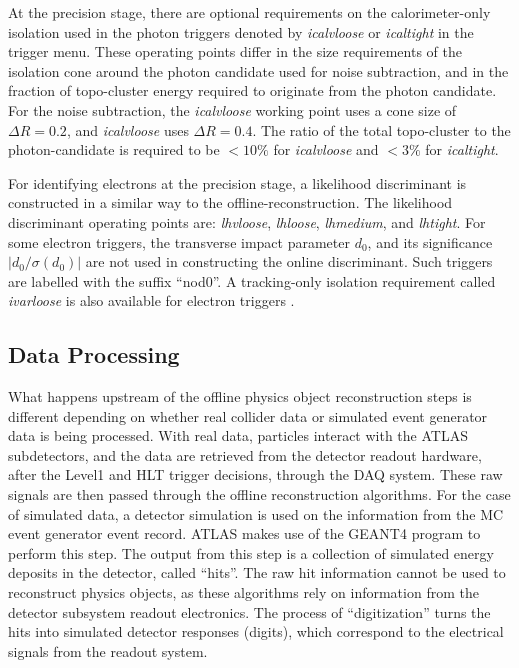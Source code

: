 At the precision stage, there are optional requirements on the calorimeter-only isolation used in the photon triggers denoted by \textit{icalvloose} or \textit{icaltight} in the trigger menu. These operating points differ in the size requirements of the isolation cone around the photon candidate used for noise subtraction, and in the fraction of topo-cluster energy required to originate from the photon candidate. For the noise subtraction, the \textit{icalvloose} working point uses a cone size of $\Delta R=0.2$, and \textit{icalvloose} uses $\Delta R=0.4$. The ratio of the total topo-cluster \et to the photon-candidate \et is required to be $<10\%$ for \textit{icalvloose} and $<3\%$ for \textit{icaltight}.

For identifying electrons at the precision stage, a likelihood discriminant is constructed in a similar way to the offline-reconstruction. The likelihood discriminant operating points are: \textit{lhvloose}, \textit{lhloose}, \textit{lhmedium}, and \textit{lhtight}. For some electron triggers, the transverse impact parameter $d_0$, and its significance $|d_0/\sigma(d_0)|$ are not used in constructing the online discriminant. Such triggers are labelled with the suffix ``nod0''. A tracking-only isolation requirement called \textit{ivarloose} is also available for electron triggers \cite{Atlas:trigegamma}. 

\subsection{Data Processing \label{sec:dataproc}}
What happens upstream of the offline physics object reconstruction steps is different depending on whether real collider data or simulated event generator data is being processed. With real data, particles interact with the ATLAS subdetectors, and the data are retrieved from the detector readout hardware, after the Level1 and HLT trigger decisions, through the DAQ system. These raw signals are then passed through the offline reconstruction algorithms. For the case of simulated data, a detector simulation is used on the information from the MC event generator event record. ATLAS makes use of the GEANT4 \cite{GEANT4} program to perform this step. The output from this step is a collection of simulated energy deposits in the detector, called ``hits''. The raw hit information cannot be used to reconstruct physics objects, as these algorithms rely on information from the detector subsystem readout electronics. The process of ``digitization'' turns the hits into simulated detector responses (digits), which correspond to the electrical signals from the readout system.

